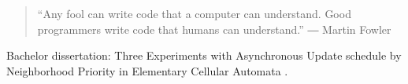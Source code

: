 
\begin{quote}
``Any fool can write code that a \newline computer can understand. Good \newline programmers write code that humans can understand.''
― Martin Fowler 
\end{quote}

%
%
%
%
%



\divider\smallskip


\smallskip

\divider

\divider

\divider


\smallskip

\divider

\divider

\divider

\divider


\medskip


Bachelor dissertation: Three Experiments with Asynchronous Update schedule by Neighborhood Priority in Elementary Cellular Automata .


\divider
